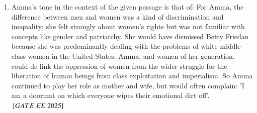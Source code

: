 \documentclass[journal,12pt,onecolumn]{IEEEtran}
\theoremstyle{remark}
\begin{document}
\begin{enumerate}
 \item Amma's tone in the context of the given passage is that of: \newline
  For Amma, the difference between men and women was a kind of discrimination and inequality; she felt strongly about women's rights but was not familiar with concepts like gender and patriarchy. She would have dismissed Betty Friedan because she was predominantly dealing with the problems of white middle-class women in the United States. Amma, and women of her generation, could de-link the oppression of women from the wider struggle for the liberation of human beings from class exploitation and imperialism. So Amma continued to play her role as mother and wife, but would often complain: 'I am a doormat on which everyone wipes their emotional dirt off'.
\hfill ${}\left[GATE\ EE\ 2025\right]$ 
    \begin{enumerate}
    \end{enumerate}


\end{enumerate}
\end{document}
